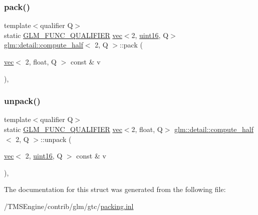 \subsubsection{\texorpdfstring{pack()}{pack()}}
{\footnotesize\ttfamily template$<$qualifier Q$>$ \\
static \hyperlink{setup_8hpp_a33fdea6f91c5f834105f7415e2a64407}{G\+L\+M\+\_\+\+F\+U\+N\+C\+\_\+\+Q\+U\+A\+L\+I\+F\+I\+ER} \hyperlink{structglm_1_1vec}{vec}$<$2, \hyperlink{namespaceglm_1_1detail_a47b2a7d006d187338e8031a352d1ce56}{uint16}, Q$>$ \hyperlink{structglm_1_1detail_1_1compute__half}{glm\+::detail\+::compute\+\_\+half}$<$ 2, Q $>$\+::pack (\begin{DoxyParamCaption}\item[{\hyperlink{structglm_1_1vec}{vec}$<$ 2, float, Q $>$ const \&}]{v }\end{DoxyParamCaption})\hspace{0.3cm}{\ttfamily [inline]}, {\ttfamily [static]}}

\mbox{\label{structglm_1_1detail_1_1compute__half_3_012_00_01_q_01_4_a14c541423f621ba292c968245435c6a7}} 
\subsubsection{\texorpdfstring{unpack()}{unpack()}}
{\footnotesize\ttfamily template$<$qualifier Q$>$ \\
static \hyperlink{setup_8hpp_a33fdea6f91c5f834105f7415e2a64407}{G\+L\+M\+\_\+\+F\+U\+N\+C\+\_\+\+Q\+U\+A\+L\+I\+F\+I\+ER} \hyperlink{structglm_1_1vec}{vec}$<$2, float, Q$>$ \hyperlink{structglm_1_1detail_1_1compute__half}{glm\+::detail\+::compute\+\_\+half}$<$ 2, Q $>$\+::unpack (\begin{DoxyParamCaption}\item[{\hyperlink{structglm_1_1vec}{vec}$<$ 2, \hyperlink{namespaceglm_1_1detail_a47b2a7d006d187338e8031a352d1ce56}{uint16}, Q $>$ const \&}]{v }\end{DoxyParamCaption})\hspace{0.3cm}{\ttfamily [inline]}, {\ttfamily [static]}}



The documentation for this struct was generated from the following file\+:\begin{DoxyCompactItemize}
\item 
/\+T\+M\+S\+Engine/contrib/glm/gtc/\hyperlink{packing_8inl}{packing.\+inl}\end{DoxyCompactItemize}
